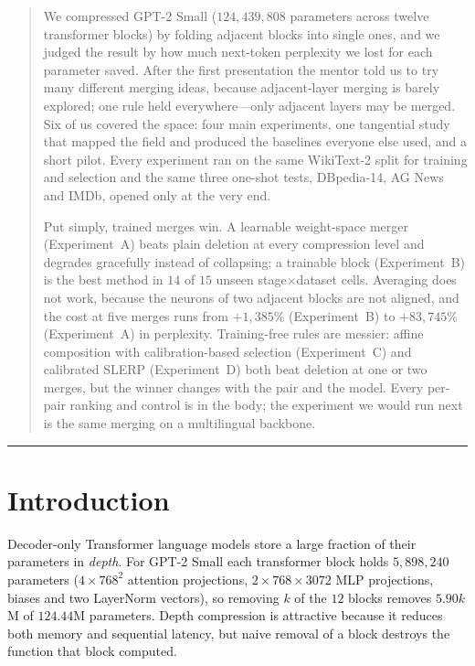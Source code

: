 \documentclass[10pt,a4paper]{article}
\begin{document}
\begin{abstract}
\small
We compressed GPT-2 Small ($124{,}439{,}808$ parameters across twelve
transformer blocks) by folding adjacent blocks into single ones, and we judged
the result by how much next-token perplexity we lost for each parameter saved.
After the first presentation the mentor told us to try many different merging
ideas, because adjacent-layer merging is barely explored; one rule held
everywhere---only adjacent layers may be merged. Six of us covered the space:
four main experiments, one tangential study that mapped the field and produced
the baselines everyone else used, and a short pilot. Every experiment ran on
the same WikiText-2 split for training and selection and the same three one-shot
tests, DBpedia-14, AG News and IMDb, opened only at the very end.

Put simply, trained merges win. A learnable weight-space merger
(Experiment~A) beats plain deletion at every compression level and degrades
gracefully instead of collapsing; a trainable block (Experiment~B) is the best
method in $14$ of $15$ unseen stage$\times$dataset cells. Averaging does not
work, because the neurons of two adjacent blocks are not aligned, and the cost
at five merges runs from $+1{,}385\%$ (Experiment~B) to $+83{,}745\%$
(Experiment~A) in perplexity. Training-free rules are messier: affine
composition with calibration-based selection (Experiment~C) and calibrated
SLERP (Experiment~D) both beat deletion at one or two merges, but the winner
changes with the pair and the model. Every per-pair ranking and control is in
the body; the experiment we would run next is the same merging on a
multilingual backbone.
\end{abstract}

\hrule height 0.4pt
\vspace{0.4em}

\section{Introduction}

Decoder-only Transformer language models
\citep{vaswani2017attention,radford2019language} store a large fraction of
their parameters in \emph{depth}. For GPT-2 Small each transformer block holds
$5{,}898{,}240$ parameters ($4\times768^2$ attention projections,
$2\times768\times3072$ MLP projections, biases and two LayerNorm vectors), so
removing $k$ of the $12$ blocks removes $5.90k$M of $124.44$M parameters. Depth
compression is attractive because it reduces both memory and sequential
latency, but naive removal of a block destroys the function that block computed.
\end{document}
